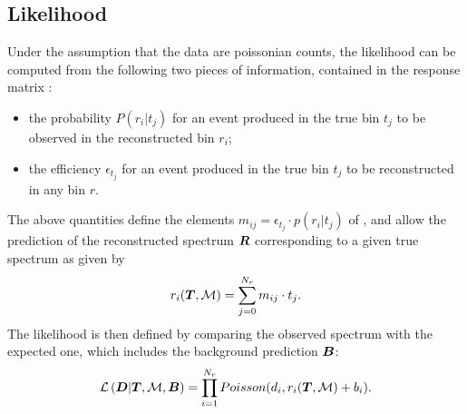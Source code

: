 \documentclass[a4paper]{article}
\begin{document}
\subsection{Likelihood}
\label{sec:fbullhood}
Under the assumption that the data are poissonian counts, the
likelihood \conditionalLhood{\Data{}}{\Truth{},\TrasfMatrix{}} can be
computed from the following two pieces of information, contained in
the response matrix \TrasfMatrix{}:
\begin{itemize}
\item the probability $P(r_i|t_j)$ for an event produced in the true bin
$t_j$ to be observed in the reconstructed bin $r_i$;
\item the efficiency $\epsilon{}_{t_j}$ for an event produced in the
true bin $t_j$ to be reconstructed in any bin $r$.
\end{itemize}
The above quantities define the elements
$m_{ij}=\epsilon_{t_j}\cdot{}p(r_i|t_j)$ of \TrasfMatrix{}, and allow
the prediction of the reconstructed spectrum $\boldsymbol{R}$ corresponding to
a given true spectrum \Truth{} as given by
\begin{equation}
r_i(\boldsymbol{T}{},\mathcal{M}{}) = \sum_{j=0}^{N_r}m_{ij}\cdot{}t_j.
\end{equation}
The likelihood is then defined by comparing the observed spectrum
\Data{} with the expected one, which includes the background
prediction $\boldsymbol{B}$:
\begin{equation}
\label{eq:lhood}
\mathcal{L}\left(\boldsymbol{D}{}|\boldsymbol{T}{},\mathcal{M}{},\boldsymbol{B}\right) =
\prod_{i=1}^{N_r}Poisson(d_i,r_i(\boldsymbol{T}{},\mathcal{M}{})+b_i).
\end{equation}
\end{document}
